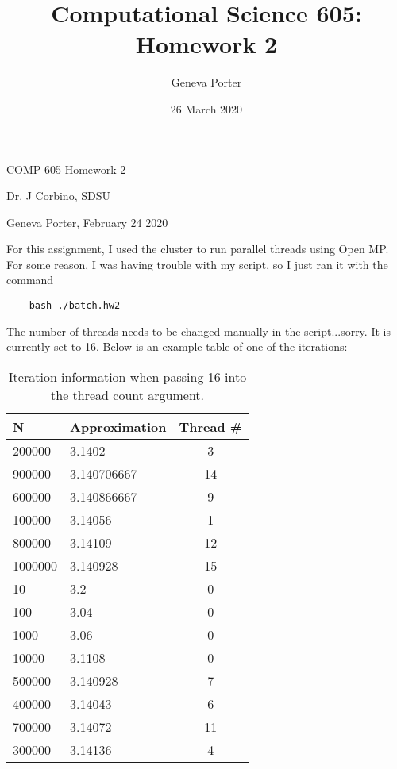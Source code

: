 \documentclass[12pt]{article}
\title{Computational Science 605: Homework 2}
\author{Geneva Porter}
\date{26 March 2020}
\begin{document}
\begin{center}
	{\huge COMP-605 Homework 2}
	
	\vspace{5mm}
	
	{\Large Dr. J Corbino, SDSU}
	
	\vspace{5mm}
	
	{\large Geneva Porter, February 24 2020}
	
	\vspace{5mm}
\end{center}

For this assignment, I used the cluster to run parallel threads using Open MP. For some reason, I was having trouble with my script, so I just ran it with the command 
\begin{verbatim}
    bash ./batch.hw2
\end{verbatim}
The number of threads needs to be changed manually in the script...sorry. It is currently set to 16. Below is an example table of one of the iterations:

\begin{table}[h]
    \centering
    \begin{tabular}{|l|l|c|} \hline
    N & Approximation & Thread # \\ \hline
    200000         &3.1402         &3         \\ \hline      
    900000         &3.140706667    &14     \\ \hline         
    600000         &3.140866667    &9      \\ \hline         
    100000         &3.14056        &1      \\ \hline         
    800000         &3.14109        &12      \\ \hline        
    1000000        &3.140928       &15      \\ \hline        
    10             &3.2            &0       \\ \hline        
    100            &3.04           &0        \\ \hline       
    1000           &3.06           &0        \\ \hline       
    10000          &3.1108         &0       \\ \hline        
    500000         &3.140928       &7        \\ \hline       
    400000         &3.14043        &6        \\ \hline       
    700000         &3.14072        &11        \\ \hline      
    300000         &3.14136        &4   \\ \hline
    \end{tabular}
	\caption{Iteration information when passing 16 into the thread count argument.}
\end{table}
\end{document}
